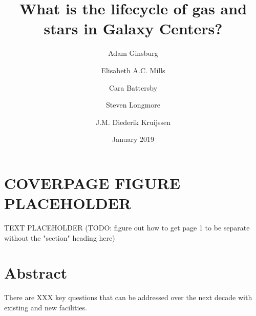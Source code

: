 \documentclass[modern]{aastex62}
\begin{document}
\author{Adam Ginsburg}
\author{Elisabeth A.C. Mills}
\author{Cara Battersby}
\author{Steven Longmore}
\author{J.M. Diederik Kruijssen}

\title{What is the lifecycle of gas and stars in Galaxy Centers?}
\date{January 2019}

\section{COVERPAGE FIGURE PLACEHOLDER}
TEXT PLACEHOLDER
(TODO: figure out how to get page 1 to be separate without the "section" heading here)

\clearpage
\newpage



\section{Abstract}
There are XXX key questions that can be addressed over the next decade with
existing and new facilities.
\end{document}
